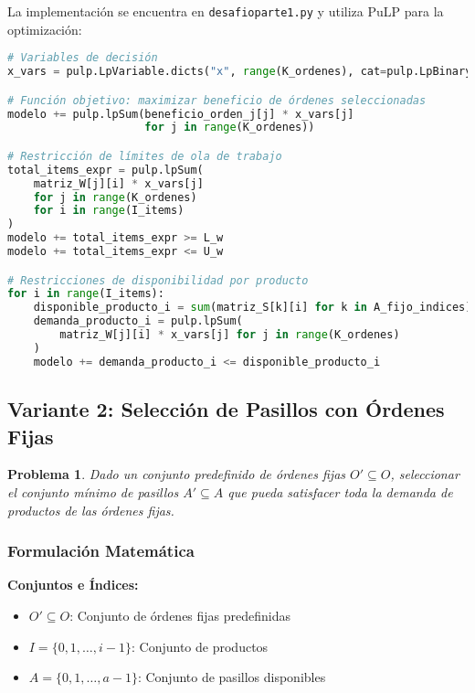 \documentclass[a4paper,12pt]{article}
\newtheorem{problem}{Problema}
\begin{document}
La implementación se encuentra en \texttt{desafioparte1.py} y utiliza PuLP para la optimización:

\begin{lstlisting}[language=Python, caption=Implementación clave de la Variante 1]
# Variables de decisión
x_vars = pulp.LpVariable.dicts("x", range(K_ordenes), cat=pulp.LpBinary)

# Función objetivo: maximizar beneficio de órdenes seleccionadas
modelo += pulp.lpSum(beneficio_orden_j[j] * x_vars[j] 
                     for j in range(K_ordenes))

# Restricción de límites de ola de trabajo
total_items_expr = pulp.lpSum(
    matriz_W[j][i] * x_vars[j] 
    for j in range(K_ordenes) 
    for i in range(I_items)
)
modelo += total_items_expr >= L_w
modelo += total_items_expr <= U_w

# Restricciones de disponibilidad por producto
for i in range(I_items):
    disponible_producto_i = sum(matriz_S[k][i] for k in A_fijo_indices)
    demanda_producto_i = pulp.lpSum(
        matriz_W[j][i] * x_vars[j] for j in range(K_ordenes)
    )
    modelo += demanda_producto_i <= disponible_producto_i
\end{lstlisting}

\subsection{Variante 2: Selección de Pasillos con Órdenes Fijas}
\label{sec:variante2}

\begin{problem}
Dado un conjunto predefinido de órdenes fijas $O' \subseteq O$, seleccionar el conjunto mínimo de pasillos $A' \subseteq A$ que pueda satisfacer toda la demanda de productos de las órdenes fijas.
\end{problem}

\subsubsection{Formulación Matemática}

\textbf{Conjuntos e Índices:}
\begin{itemize}
    \item $O' \subseteq O$: Conjunto de órdenes fijas predefinidas
    \item $I = \{0, 1, \ldots, i-1\}$: Conjunto de productos
    \item $A = \{0, 1, \ldots, a-1\}$: Conjunto de pasillos disponibles
\end{itemize}
\end{document}
